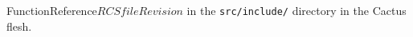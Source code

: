 \begin{cactuspart}{FunctionReference}{$RCSfile$}{$Revision$}
in the \verb|src/include/| directory in the Cactus flesh.

\end{cactuspart}
